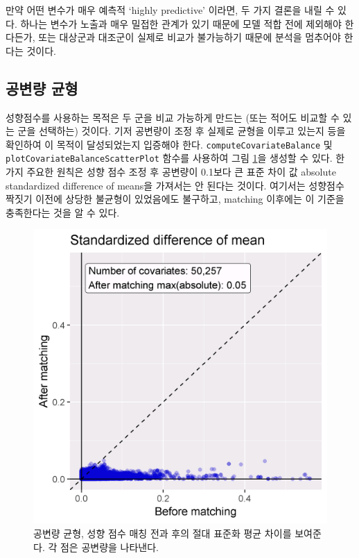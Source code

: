\documentclass[10.5pt]{book}
\theoremstyle{definition}
\theoremstyle{definition}
\theoremstyle{definition}
\theoremstyle{remark}
\let\BeginKnitrBlock\begin \let\EndKnitrBlock\end
\begin{document}
\BeginKnitrBlock{rmdimportant}
만약 어떤 변수가 매우 예측적 `highly predictive' 이라면, 두 가지 결론을
내릴 수 있다. 하나는 변수가 노출과 매우 밀접한 관계가 있기 때문에 모델
적합 전에 제외해야 한다든가, 또는 대상군과 대조군이 실제로 비교가
불가능하기 때문에 분석을 멈추어야 한다는 것이다.
\EndKnitrBlock{rmdimportant}

\subsection{공변량 균형}\label{-}

성향점수를 사용하는 목적은 두 군을 비교 가능하게 만드는 (또는 적어도
비교할 수 있는 군을 선택하는) 것이다. 기저 공변량이 조정 후 실제로
균형을 이루고 있는지 등을 확인하여 이 목적이 달성되었는지 입증해야 한다.
\texttt{computeCovariateBalance} 및
\texttt{plotCovariateBalanceScatterPlot} 함수를 사용하여 그림
\ref{fig:balance}을 생성할 수 있다. 한 가지 주요한 원칙은 성향 점수 조정
후 공변량이 0.1보다 큰 표준 차이 값 absolute standardized difference of
means을 가져서는 안 된다는 것이다. 여기서는 성향점수 짝짓기 이전에
상당한 불균형이 있었음에도 불구하고, matching 이후에는 이 기준을
충족한다는 것을 알 수 있다.

\begin{figure}

{\centering \includegraphics[width=0.7\linewidth]{images/PopulationLevelEstimation/balance} 

}

\caption{공변량 균형, 성향 점수 매칭 전과 후의 절대 표준화 평균 차이를 보여준다. 각 점은 공변량을 나타낸다.}\label{fig:balance}
\end{figure}
\end{document}

